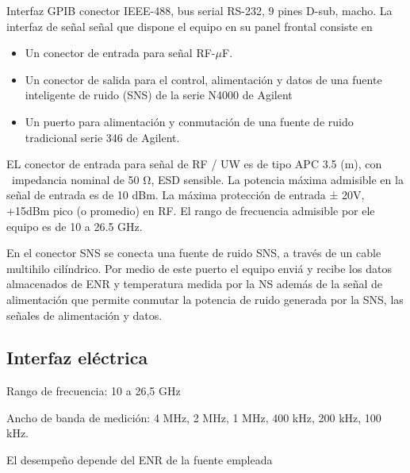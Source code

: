 Interfaz GPIB conector IEEE-488, bus serial RS-232, 9 pines D-sub, macho.	
La interfaz de señal señal que dispone el equipo en su panel frontal consiste en 

\begin{itemize}
	\item Un conector de entrada para señal RF-$\mu${\textmu}F. 
	\item Un conector de salida para el control, alimentación y datos de una fuente inteligente de ruido (SNS) de la serie N4000 de Agilent 
	\item Un puerto para alimentación y conmutación de una fuente de ruido tradicional serie 346 de Agilent. 
\end{itemize}
EL conector de entrada para señal de RF / UW es de tipo APC 3.5 (m), con \ impedancia nominal de 50 Ω, ESD sensible. La potencia máxima admisible en la señal de entrada es de 10 dBm. La máxima protección de entrada ± 20V, +15dBm pico (o promedio) en RF. El rango de frecuencia admisible por ele equipo es de 10 a 26.5 GHz.

En el conector SNS se conecta una fuente de ruido SNS, a través de un cable multihilo cilíndrico. Por medio de este puerto el equipo enviá y recibe los datos almacenados de ENR y temperatura medida por la NS además de la señal de alimentación que permite conmutar la potencia de ruido generada por la SNS, las señales de alimentación y datos. 

\subsection{Interfaz eléctrica}

Rango de frecuencia: 10 a 26,5 GHz

Ancho de banda de medición: 4 MHz, 2 MHz, 1 MHz, 400 kHz, 200 kHz, 100 kHz.

El desempeño depende del ENR de la fuente empleada	

